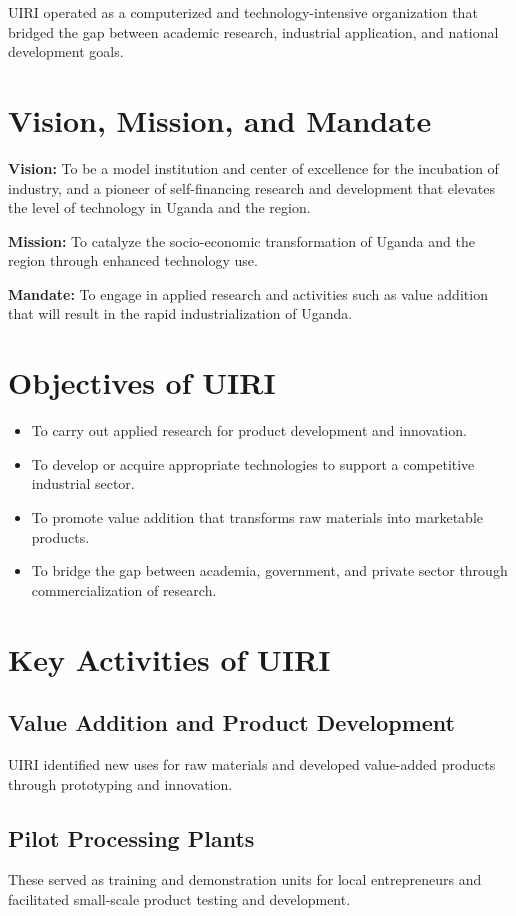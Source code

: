 \documentclass[12pt,a4paper]{report}
\begin{document}
\noindent UIRI operated as a computerized and technology-intensive organization that bridged the gap between academic research, industrial application, and national development goals.

\section{Vision, Mission, and Mandate}
\noindent\textbf{Vision:} To be a model institution and center of excellence for the incubation of industry, and a pioneer of self-financing research and development that elevates the level of technology in Uganda and the region.

\noindent\textbf{Mission:} To catalyze the socio-economic transformation of Uganda and the region through enhanced technology use.

\noindent\textbf{Mandate:} To engage in applied research and activities such as value addition that will result in the rapid industrialization of Uganda.

\newpage
\section{Objectives of UIRI}
\begin{itemize}
    \item To carry out applied research for product development and innovation.
    \item To develop or acquire appropriate technologies to support a competitive industrial sector.
    \item To promote value addition that transforms raw materials into marketable products.
    \item To bridge the gap between academia, government, and private sector through commercialization of research.
\end{itemize}

\section{Key Activities of UIRI}

\subsection{Value Addition and Product Development}
\noindent UIRI identified new uses for raw materials and developed value-added products through prototyping and innovation.

\subsection{Pilot Processing Plants}
\noindent These served as training and demonstration units for local entrepreneurs and facilitated small-scale product testing and development.
\end{document}
